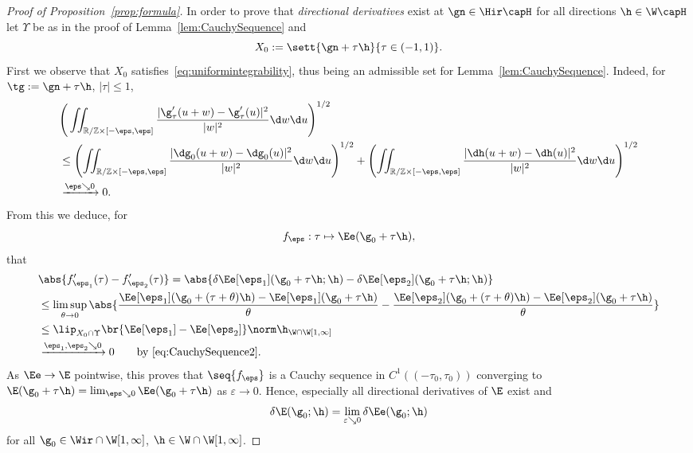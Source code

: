 \begin{proof}[Proof of Proposition~\ref{prop:formula}]
 In order to prove that \emph{directional derivatives} exist at $\gn\in\Hir\capH$ for all directions $\h\in\W\capH$
 let $\Upsilon$ be as in the proof of Lemma~\ref{lem:CauchySequence} and
 \begin{equation*}
  X_0 := \sett{ \gn + \tau\h}{\tau \in (-1,1)}.
 \end{equation*}
 First we observe that $X_0$ satisfies~\eqref{eq:uniformintegrability}, thus being an admissible set
 for Lemma~\ref{lem:CauchySequence}. Indeed,
 for $\gt := \gn +\tau\h$, $|\tau| \leq 1$,
 \begin{align}
  &\Bigg( \iint_{\mathbb R / \mathbb Z \times [-\eps, \eps]} 
  \frac {|\g_\tau'(u+w) - \g_\tau'(u)|^2}{|w|^2} \d w\d u \Bigg)^{1/2}  \nonumber \\
  &\leq \left( \iint_{\mathbb R / \mathbb Z \times [-\eps, \eps]}
  \frac {|\dg_{0}(u+w) - \dg_{0}(u)|^2}{|w|^2} \d w \d u \right)^{1/2}
  +  \left( \iint_{\mathbb R / \mathbb Z \times [-\eps, \eps]}
  \frac {|\dh(u+w) - \dh(u)|^2}{|w|^2} \d w \d u \right)^{1/2} 
  \nonumber\\
  &\xrightarrow{\eps\searrow0} 0.\label{eq:X0}
 \end{align}
 From this we deduce,
 for
 \[ f_\eps : \tau\mapsto \Ee(\g_{0}+\tau\h), \]
 that
 \begin{align}
  &\abs{f_{\eps_1}'(\tau)-f_{\eps_2}'(\tau)}
  =\abs{\delta\Ee[\eps_1](\g_0+\tau \h;\h)-\delta\Ee[\eps_2](\g_0+\tau \h;\h)} \nonumber\\
  &\le\limsup_{\theta\to0}\abs{\frac{\Ee[\eps_1](\g_0+(\tau+\theta)\h)-\Ee[\eps_1](\g_0+\tau \h)}{\theta}
   - \frac{\Ee[\eps_2](\g_0+(\tau+\theta)\h)-\Ee[\eps_2](\g_0+\tau \h)}{\theta}} \nonumber\\  
  &\le \lip_{X_0\cap\Upsilon}\br{\Ee[\eps_1]-\Ee[\eps_2]}\norm \h_{\W\cap\W[1	,\infty]}\label{eq:f-f}\\
  &\xrightarrow{\eps_1,\eps_2\searrow0}0\qquad\text{by \eqref{eq:CauchySequence2}.}\nonumber
 \end{align}
 As $\Ee\to\E$ pointwise, this proves that $\seq{f_\eps}$
 is a Cauchy sequence in $C^1((-\tau_0, \tau_0))$ converging to $\E(\g_0 + \tau \h)=\lim_{\eps\searrow0}\Ee(\g_0+\tau \h)$ as 
 $ \varepsilon \rightarrow 0$.
 Hence, especially all directional derivatives of $\E$ exist and
 \begin{equation*}
  \delta \E (\g_0;\h) = \lim_{\varepsilon \searrow 0} \delta \Ee (\g_0;\h)
 \end{equation*}
 for all $\g_0 \in \Wir\cap\W[1,\infty]$, $\h \in \W\cap\W[1,\infty]$.
 

\end{proof}
